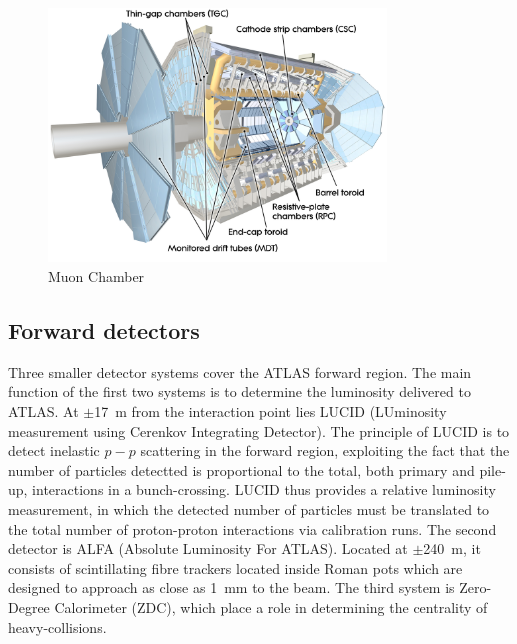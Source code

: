 \begin{figure}[htbp]
  \begin{center}
      \includegraphics[width=0.8\textwidth]{Fig2/MuonChamber.pdf}
    \caption{Muon Chamber}
    \label{fig:MUON1}
  \end{center}
\end{figure}

\subsection{Forward detectors}\label{sec:forward}

Three smaller detector systems cover the ATLAS forward region. The main function of the first two systems is to determine the luminosity delivered to ATLAS. At $\pm$17~m from the interaction point lies LUCID (LUminosity measurement using Cerenkov Integrating Detector). The principle of LUCID is to detect inelastic $p-p$ scattering in the forward region, exploiting the fact that the number of particles detectted is proportional to the total, both primary and pile-up, interactions in a bunch-crossing.  LUCID thus provides a relative luminosity measurement, in which the detected number of particles must be translated to the total number of proton-proton interactions via calibration runs.
The second detector is ALFA (Absolute Luminosity For ATLAS). Located at $\pm$240~m, it consists of scintillating fibre trackers located inside Roman pots which are designed to approach as close as 1~mm to the beam. 
The third system is Zero-Degree Calorimeter (ZDC), which place a role in determining the centrality of heavy-collisions.



